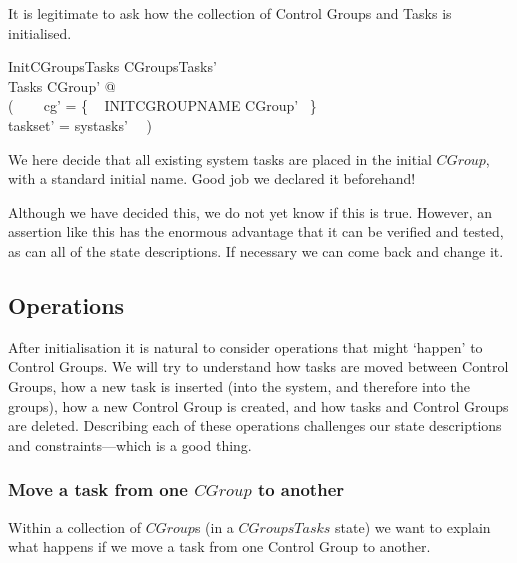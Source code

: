 \documentclass[a4paper,twoside,12pt]{article}
\begin{document}
It is legitimate to ask how the collection of Control Groups and Tasks is initialised.

\begin{schema}{InitCGroupsTasks}
CGroupsTasks' \\
\Xi Tasks
\where
\exists CGroup' @ \\
( ~~~ cg' = \{ ~ INITCGROUPNAME \mapsto \theta CGroup' ~\} \\
\land taskset' = systasks' ~~)
\end{schema}
We here decide that all existing system tasks are placed in the initial $CGroup$, with a standard initial name. Good job we declared it beforehand!

Although we have decided this, we do not yet know if this is true. However, an assertion like this has the enormous advantage that it can be verified and tested, as can all of the state descriptions. If necessary we can come back and change it.

\subsection{Operations}

After initialisation it is natural to consider operations that might `happen' to Control Groups. We will try to understand how tasks are moved between Control Groups, how a new task is inserted (into the system, and therefore into the groups), how a new Control Group is created, and how tasks and Control Groups are deleted. Describing each of these operations challenges our state descriptions and constraints---which is a good thing.


\subsubsection{Move a task from one $CGroup$ to another}

Within a collection of $CGroup$s (in a $CGroupsTasks$ state) we want to explain what happens if we move a task from one Control Group to another.
\end{document}

